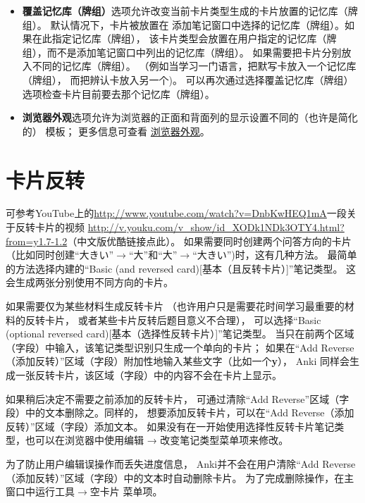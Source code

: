 \documentclass[a4paper]{book}
\begin{document}
	\begin{itemize}
		\itemsep1pt\parskip0pt
		\item \textbf{覆盖记忆库（牌组）}选项允许改变当前卡片类型生成的卡片放置的记忆库（牌组）。 默认情况下，卡片被放置在 添加笔记窗口中选择的记忆库（牌组）。如果在此指定记忆库（牌组）， 该卡片类型会放置在用户指定的记忆库（牌组），而不是添加笔记窗口中列出的记忆库（牌组）。 如果需要把卡片分别放入不同的记忆库（牌组）。 （例如当学习一门语言，把默写卡放入一个记忆库（牌组）， 而把辨认卡放入另一个)。 可以再次通过选择覆盖记忆库（牌组）选项检查卡片目前要去那个记忆库（牌组）。
		\item \textbf{浏览器外观}选项允许为浏览器的正面和背面列的显示设置不同的（也许是简化的） 模板； 更多信息可查看
		\hyperref[columntemplates]{浏览器外观}。
	\end{itemize}
	\section{卡片反转}\label{reversingcards}
	可参考YouTube上的\url{http://www.youtube.com/watch?v=DnbKwHEQ1mA}一段关于反转卡片的视频
	\url{http://v.youku.com/v_show/id_XODk1NDk3OTY4.html?from=y1.7-1.2}（中文版优酷链接点此）。
	如果需要同时创建两个问答方向的卡片 （比如同时创建“大きい”$\to$“大”和“大”$\to$“大きい”)时，这有几种方法。 最简单的方法选择内建的“Basic (and reversed card)[基本（且反转卡片）]”笔记类型。 这会生成两张分别使用不同方向的卡片。
	
	如果需要仅为某些材料生成反转卡片 （也许用户只是需要花时间学习最重要的材料的反转卡片， 或者某些卡片反转后题目意义不合理）， 可以选择“Basic (optional reversed card)[基本（选择性反转卡片）]”笔记类型。 当只在前两个区域（字段）中输入，该笔记类型识别只生成一个单向的卡片； 如果在“Add Reverse（添加反转）”区域（字段）附加性地输入某些文字（比如一个\textbf{y}）， Anki 同样会生成一张反转卡片，该区域（字段）中的内容不会在卡片上显示。
	
	如果稍后决定不需要之前添加的反转卡片， 可通过清除“Add Reverse”区域（字段）中的文本删除之。同样的， 想要添加反转卡片，可以在“Add Reverse（添加反转）”区域（字段）添加文本。 如果没有在一开始使用选择性反转卡片笔记类型，也可以在浏览器中使用编辑 → 改变笔记类型菜单项来修改。
	
	\begin{shaded}
		为了防止用户编辑误操作而丢失进度信息， Anki并不会在用户清除“Add Reverse（添加反转）”区域（字段）中的文本时自动删除卡片。 为了完成删除操作，在主窗口中运行工具$\to$空卡片
		菜单项。
	\end{shaded}
	
\end{document}
